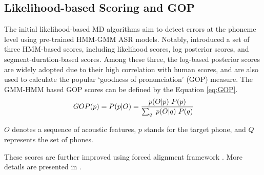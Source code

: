 \documentclass[11pt]{article}
\begin{document}
\subsection{Likelihood-based Scoring and GOP}
The initial likelihood-based MD algorithms aim to detect errors at the phoneme level using pre-trained HMM-GMM ASR models. Notably, \citet{kim1997automatic} introduced a set of three HMM-based scores, including likelihood scores, log posterior scores, and segment-duration-based scores. Among these three, the log-based posterior scores are widely adopted due to their high correlation with human scores, and are also used to calculate the popular `goodness of pronunciation' (GOP) measure. 
The GMM-HMM based GOP scores can be defined by the Equation \ref{eq:GOP}.
\begin{equation}
\small
    GOP(p)=P(p|O) = \frac{p(O|p) \ P(p)}{\sum_{q} \ p(O|q)\ P(q)}
\label{eq:GOP}
\end{equation}

\noindent $O$ denotes a sequence of acoustic features, $p$ stands for the target phone, and $Q$ represents the set of phones.

\noindent These scores are further improved using forced alignment framework \cite{kawai1998call}. More details are presented in \citet{GOP_WITT}. 









\end{document}
